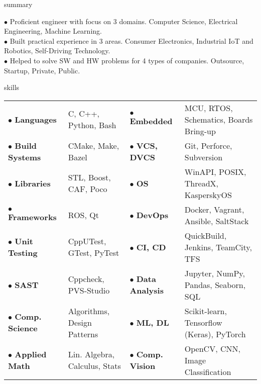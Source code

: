 \documentclass{template}
\begin{document}
\begin{rSection}{summary}

$\bullet$ Proficient engineer with focus on 3 domains. Computer Science, Electrical Engineering, Machine Learning. \\
$\bullet$ Built practical experience in 3 areas. Consumer Electronics, Industrial IoT and Robotics, Self-Driving Technology. \\
$\bullet$ Helped to solve SW and HW problems for 4 types of companies. Outsource, Startup, Private, Public.

\end{rSection}

\begin{rSection}{skills}
\begin{tabular}{llll}

$\bullet$ \textbf{Languages}     & C, C++, Python, Bash          & $\bullet$ \textbf{Embedded}      & MCU, RTOS, Schematics, Boards Bring-up \\
$\bullet$ \textbf{Build Systems} & CMake, Make, Bazel            & $\bullet$ \textbf{VCS, DVCS}     & Git, Perforce, Subversion \\
$\bullet$ \textbf{Libraries}     & STL, Boost, CAF, Poco         & $\bullet$ \textbf{OS}            & WinAPI, POSIX, ThreadX, KasperskyOS \\
$\bullet$ \textbf{Frameworks}    & ROS, Qt                       & $\bullet$ \textbf{DevOps}        & Docker, Vagrant, Ansible, SaltStack \\
$\bullet$ \textbf{Unit Testing}  & CppUTest, GTest, PyTest       & $\bullet$ \textbf{CI, CD}        & QuickBuild, Jenkins, TeamCity, TFS \\
$\bullet$ \textbf{SAST}          & Cppcheck, PVS‑Studio          & $\bullet$ \textbf{Data Analysis} & Jupyter, NumPy, Pandas, Seaborn, SQL \\
$\bullet$ \textbf{Comp. Science} & Algorithms, Design Patterns   & $\bullet$ \textbf{ML, DL}        & Scikit-learn, Tensorflow (Keras), PyTorch \\
$\bullet$ \textbf{Applied Math}  & Lin. Algebra, Calculus, Stats & $\bullet$ \textbf{Comp. Vision}  & OpenCV, CNN, Image Classification \\

\end{tabular}
\end{rSection}
\end{document}
